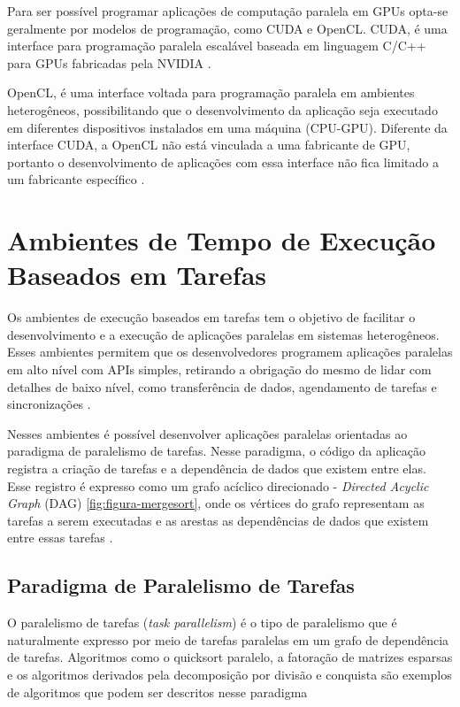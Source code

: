 Para ser possível programar aplicações de computação paralela em GPUs opta-se geralmente por modelos de programação, como CUDA e OpenCL.
CUDA, é uma interface para programação paralela escalável baseada em linguagem C/C++ para GPUs fabricadas pela NVIDIA \cite{hennessy2014organizaccao}.

OpenCL, é uma interface voltada para programação paralela em ambientes heterogêneos, possibilitando que o desenvolvimento da aplicação seja executado em diferentes dispositivos instalados em uma máquina (CPU-GPU).
Diferente da interface CUDA, a OpenCL não está vinculada a uma fabricante de GPU, portanto o desenvolvimento de aplicações com essa interface não fica limitado a um fabricante específico \cite{opencl:2018}.

\newpage

\section{Ambientes de Tempo de Execução Baseados em Tarefas}
Os ambientes de execução baseados em tarefas tem o objetivo de facilitar o desenvolvimento e a execução de aplicações paralelas em sistemas heterogêneos.
Esses ambientes permitem que os desenvolvedores programem aplicações paralelas em alto nível com APIs simples, retirando a obrigação do mesmo de lidar com detalhes de baixo nível, como transferência de dados, agendamento de tarefas e sincronizações \cite{kumar:tel-01538516}.

Nesses ambientes é possível desenvolver aplicações paralelas orientadas ao paradigma de paralelismo de tarefas.
Nesse paradigma, o código da aplicação registra a criação de tarefas e a dependência de dados que existem entre elas.
Esse registro é expresso como um grafo acíclico direcionado - \textit{Directed Acyclic Graph} (DAG) \autoref{fig:figura-mergesort}, onde os vértices do grafo representam as tarefas a serem executadas e as arestas as dependências de dados que existem entre essas tarefas \cite{kumar:tel-01538516,thoman2018taxonomy}.

\subsection{Paradigma de Paralelismo de Tarefas}

\begin{citacao}
O paralelismo de tarefas (\textit{task parallelism}) é o tipo de paralelismo que é naturalmente expresso por meio de tarefas paralelas em um grafo de dependência de tarefas.
Algoritmos como o quicksort paralelo, a fatoração de matrizes esparsas e os algoritmos derivados pela decomposição por divisão e conquista são exemplos de algoritmos que podem ser descritos nesse paradigma    %
\end{citacao}

